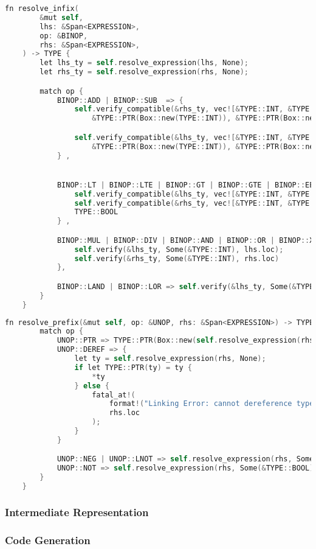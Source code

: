 \begin{lstlisting}[language=C]
    fn resolve_infix(
        &mut self,
        lhs: &Span<EXPRESSION>,
        op: &BINOP,
        rhs: &Span<EXPRESSION>,
    ) -> TYPE {
        let lhs_ty = self.resolve_expression(lhs, None);
        let rhs_ty = self.resolve_expression(rhs, None);

        match op {
            BINOP::ADD | BINOP::SUB  => { 
                self.verify_compatible(&rhs_ty, vec![&TYPE::INT, &TYPE::CHAR, 
                    &TYPE::PTR(Box::new(TYPE::INT)), &TYPE::PTR(Box::new(TYPE::CHAR)) ], rhs.loc);

                self.verify_compatible(&lhs_ty, vec![&TYPE::INT, &TYPE::CHAR, 
                    &TYPE::PTR(Box::new(TYPE::INT)), &TYPE::PTR(Box::new(TYPE::CHAR)) ], lhs.loc)
            } ,


            BINOP::LT | BINOP::LTE | BINOP::GT | BINOP::GTE | BINOP::EE | BINOP::NE  => { 
                self.verify_compatible(&lhs_ty, vec![&TYPE::INT, &TYPE::CHAR], lhs.loc);
                self.verify_compatible(&rhs_ty, vec![&TYPE::INT, &TYPE::CHAR], rhs.loc);
                TYPE::BOOL
            } ,

            BINOP::MUL | BINOP::DIV | BINOP::AND | BINOP::OR | BINOP::XOR => { 
                self.verify(&lhs_ty, Some(&TYPE::INT), lhs.loc);
                self.verify(&rhs_ty, Some(&TYPE::INT), rhs.loc)
            },

            BINOP::LAND | BINOP::LOR => self.verify(&lhs_ty, Some(&TYPE::BOOL), lhs.loc)
        }
    }
\end{lstlisting}

\begin{lstlisting}[language=C]
    fn resolve_prefix(&mut self, op: &UNOP, rhs: &Span<EXPRESSION>) -> TYPE {
        match op {
            UNOP::PTR => TYPE::PTR(Box::new(self.resolve_expression(rhs, None))),
            UNOP::DEREF => {
                let ty = self.resolve_expression(rhs, None);
                if let TYPE::PTR(ty) = ty {
                    *ty
                } else {
                    fatal_at!(
                        format!("Linking Error: cannot dereference type '{}'", ty),
                        rhs.loc
                    );
                }
            }

            UNOP::NEG | UNOP::LNOT => self.resolve_expression(rhs, Some(&TYPE::INT)),
            UNOP::NOT => self.resolve_expression(rhs, Some(&TYPE::BOOL)),
        }
    } 
\end{lstlisting}


\subsubsection{Intermediate Representation}
\subsubsection{Code Generation}